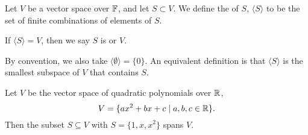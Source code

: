 \documentclass[a4paper]{scrartcl}
\begin{document}
\begin{definition}[Span]
    Let $V$ be a vector space over $\mathbb{F}$, and let $S \subset V$. We define the  of $S$, $\langle S \rangle$ to be the set of finite combinations of elements of $S$.

    If $\langle S \rangle = V$, then we say $S$ is  or  $V$.
\end{definition}

\begin{remark}
    By convention, we also take $\langle \emptyset \rangle = \{ 0\}$. An equivalent definition is that $\langle S \rangle$ is the smallest subspace of $V$ that contains $S$.
\end{remark}

\begin{example}
    Let $V$ be the vector space of quadratic polynomials over $\mathbb{R}$, 
    $$V = \{ax^2 + bx + c \mid a, b, c \in \mathbb{R}\}.$$ 
    Then the subset $S \subseteq V$ with $S = \{1, x, x^2\}$ spans $V$.
\end{example}





\end{document}

